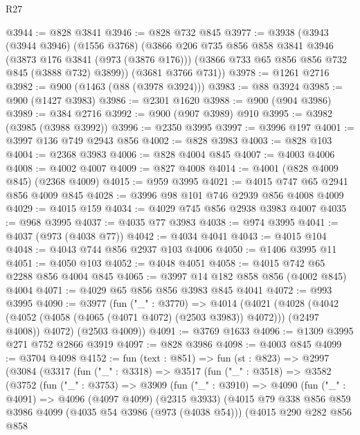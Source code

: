 \begin{lexlean}{R27}
\begin{coremodule}
@3944 := @828 @3841
@3946 := @828 @732 @845
@3977 := @3938
    (@3943
      (@3944 @3946)
      (@1556 @3768)
      (@3866
        @206
        @735
        @856
        @858
        @3841
        @3946
        (@3873 @176 @3841 (@973 (@3876 @176)))
        (@3866 @733 @65 @856 @856 @732 @845 (@3888 @732) @3899))
      (@3681 @3766 @731))
@3978 := @1261 @2716
@3982 := @900 (@1463 (@88 (@3978 @3924)))
@3983 := @88 @3924
@3985 := @900 (@1427 @3983)
@3986 := @2301 @1620
@3988 := @900 (@904 @3986)
@3989 := @384 @2716
@3992 := @900 (@907 @3989) @910
@3995 := @3982 (@3985 (@3988 @3992))
@3996 := @2350 @3995
@3997 := @3996 @197
@4001 := @3997 @136 @749 @2943 @856
@4002 := @828 @3983
@4003 := @828 @103
@4004 := @2368 @3983
@4006 := @828 @4004 @845
@4007 := @4003 @4006
@4008 := @4002 @4007
@4009 := @827 @4008
@4014 := @4001 (@828 @4009 @845) (@2368 @4009)
@4015 := @959 @3995
@4021 := @4015 @747 @65 @2941 @856 @4009 @845
@4028 := @3996 @98 @101 @746 @2939 @856 @4008 @4009
@4029 := @4015 @159
@4034 := @4029 @745 @856 @2938 @3983 @4007
@4035 := @968 @3995
@4037 := @4035 @77 @3983
@4038 := @974 @3995
@4041 := @4037 (@973 (@4038 @77))
@4042 := @4034 @4041
@4043 := @4015 @104
@4048 := @4043 @744 @856 @2937 @103 @4006
@4050 := @1406 @3995 @11
@4051 := @4050 @103
@4052 := @4048 @4051
@4058 := @4015 @742 @65 @2288 @856 @4004 @845
@4065 := @3997 @14 @182 @858 @856 (@4002 @845) @4004
@4071 := @4029 @65 @856 @856 @3983 @845 @4041
@4072 := @993 @3995
@4090 := @3977
    (fun ("_" : @3770) =>
    @4014
      (@4021
        (@4028 (@4042 (@4052 (@4058 (@4065 (@4071 @4072) (@2503 @3983)) @4072))) (@2497 @4008))
        @4072)
      (@2503 @4009))
@4091 := @3769 @1633
@4096 := @1309 @3995 @271 @752 @2866 @3919
@4097 := @828 @3986
@4098 := @4003 @845
@4099 := @3704 @4098
@4152 := fun (text : @851) =>
  fun (st : @823) =>
  @2997
    (@3084
      (@3317
        (fun ("_" : @3318) =>
        @3517
          (fun ("_" : @3518) =>
          @3582
            (@3752
              (fun ("_" : @3753) =>
              @3909
                (fun ("_" : @3910) =>
                @4090
                  (fun ("_" : @4091) =>
                  @4096
                    (@4097 @4099)
                    (@2315 @3933)
                    (@4015
                      @79
                      @338
                      @856
                      @859
                      @3986
                      @4099
                      (@4035 @54 @3986 (@973 (@4038 @54)))
                      (@4015
                        @290
                        @282
                        @856
                        @858

\end{coremodule}
\end{lexlean}
